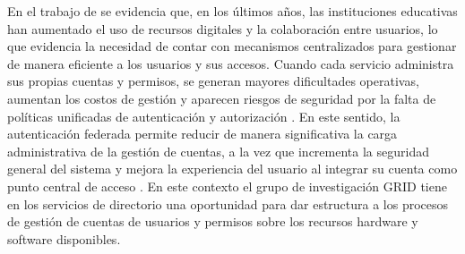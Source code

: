 \label{cap:justificacion}
\vspace*{0.7cm}

En el trabajo de \citet{Felts2023} se evidencia que, en los últimos años, las instituciones educativas han aumentado el uso de recursos digitales y la colaboración entre usuarios, lo que evidencia la necesidad de contar con mecanismos centralizados para gestionar de manera eficiente a los usuarios y sus accesos. Cuando cada servicio administra sus propias cuentas y permisos, se generan mayores dificultades operativas, aumentan los costos de gestión y aparecen riesgos de seguridad por la falta de políticas unificadas de autenticación y autorización \citep{Pohn2020}. En este sentido, la autenticación federada permite reducir de manera significativa la carga administrativa de la gestión de cuentas, a la vez que incrementa la seguridad general del sistema y mejora la experiencia del usuario al integrar su cuenta como punto central de acceso \citep{Prout2019}. En este contexto el grupo de investigación \ac{GRID} tiene en los servicios de directorio una oportunidad para dar estructura a los procesos de gestión de cuentas de usuarios y permisos sobre los recursos hardware y software disponibles.
